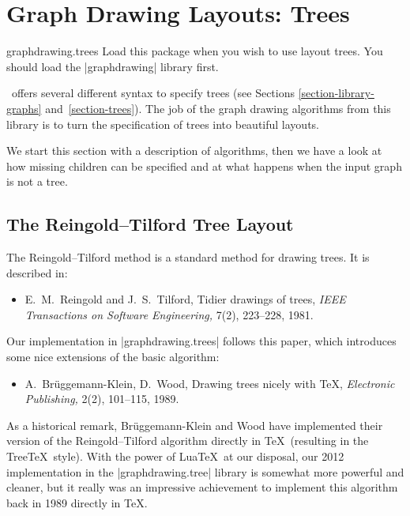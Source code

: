 %
%
%

\section{Graph Drawing Layouts: Trees}
\label{section-first-graphdrawing-library-in-manual}
\label{section-library-graphdrawing-trees}

{}

\begin{tikzlibrary}{graphdrawing.trees}
  Load this package when you wish to use layout trees. You should load
  the |graphdrawing| library first. 
\end{tikzlibrary}


\tikzname\ offers several different syntax to specify trees (see
Sections \ref{section-library-graphs}
and~\ref{section-trees}). The job of the graph drawing algorithms from
this library is to turn the specification of trees into beautiful
layouts. 

We start this section with a description of algorithms, then we have a
look at how missing children can be specified and at what happens when
the input graph is not a tree.


\subsection{The Reingold--Tilford Tree Layout}

The Reingold--Tilford method is a standard method for drawing
trees. It is described in:
\begin{itemize}
\item
  E.~M.\ Reingold and J.~S.\ Tilford,
  \newblock Tidier drawings of trees,
  \newblock \emph{IEEE Transactions on Software Engineering,}
  7(2), 223--228, 1981.
\end{itemize}
Our implementation in |graphdrawing.trees| follows this paper, which
introduces some nice extensions of the basic algorithm:
\begin{itemize}
\item
  A.\ Br\"uggemann-Klein, D.\ Wood,
  \newblock Drawing trees nicely with \TeX,
  \emph{Electronic Publishing,} 2(2), 101--115, 1989.
\end{itemize}
As a historical remark, Br\"uggemann-Klein and Wood have implemented
their version of the Reingold--Tilford algorithm directly in \TeX\
(resulting in the Tree\TeX\ style). With the power of Lua\TeX\ at
our disposal, our 2012 implementation in the |graphdrawing.tree|
library is somewhat more powerful and cleaner, but it really was an
impressive achievement to implement this algorithm back in 1989
directly in \TeX. 


